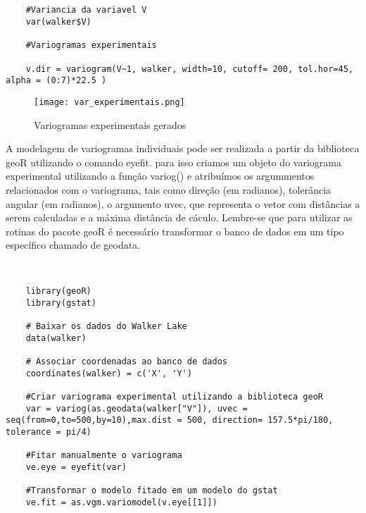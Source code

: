 \begin{scriptsize}
	\estiloR
	\begin{lstlisting}[caption={Criação de um vetor em R}, label=lst:rcode]
	
	
	#Variancia da variavel V
	var(walker$V)
	
	#Variogramas experimentais 
	
	v.dir = variogram(V~1, walker, width=10, cutoff= 200, tol.hor=45, alpha = (0:7)*22.5 )

	\end{lstlisting}
\end{scriptsize}

\FloatBarrier
\begin{figure}[H]
	\centering
	\texttt{[image: var\_experimentais.png]}	
	\caption{Variogramas experimentais gerados}
	\label{walk}
\end{figure}
\FloatBarrier

A modelagem de variogramas individuais pode ser realizada a partir da biblioteca geoR utilizando o comando eyefit. para isso criamos um objeto do variograma experimental utilizando a função variog() e atribuímos os argummentos relacionados com o variograma, tais como direção (em radianos), tolerância angular (em radianos), o argumento uvec, que representa o vetor com distâncias a serem calculadas e a máxima distância de cáculo. Lembre-se que para utilizar as rotinas do pacote geoR é necessário transformar o banco de dados em um tipo específico chamado de geodata. 



\begin{scriptsize}
	\estiloR
	\begin{lstlisting}[caption={Criação de um vetor em R}, label=lst:rcode]
	
	
	library(geoR)
	library(gstat)
	
	# Baixar os dados do Walker Lake
	data(walker)
	
	# Associar coordenadas ao banco de dados 
	coordinates(walker) = c('X', 'Y')
	
	#Criar variograma experimental utilizando a biblioteca geoR
	var = variog(as.geodata(walker["V"]), uvec = seq(from=0,to=500,by=10),max.dist = 500, direction= 157.5*pi/180, tolerance = pi/4)
	
	#Fitar manualmente o variograma  
	ve.eye = eyefit(var)
	
	#Transformar o modelo fitado em um modelo do gstat
	ve.fit = as.vgm.variomodel(v.eye[[1]])
	
	\end{lstlisting}
\end{scriptsize}

